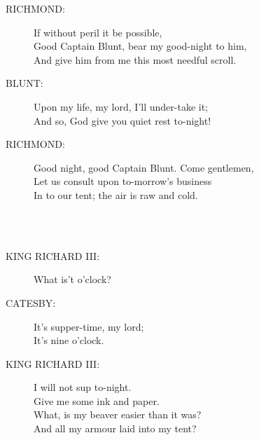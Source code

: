 \documentclass{article}
\begin{document}
\begin{description}
\item[RICHMOND:] 
\hspace{1pt}If without peril it be possible,\\
\hspace{1pt}Good Captain Blunt, bear my good-night to him,\\
\hspace{1pt}And give him from me this most needful scroll.\\
\end{description}
\begin{description}
\item[BLUNT:] 
\hspace{1pt}Upon my life, my lord, I'll under-take it;\\
\hspace{1pt}And so, God give you quiet rest to-night!\\
\end{description}
\begin{description}
\item[RICHMOND:] 
\hspace{1pt}Good night, good Captain Blunt. Come gentlemen,\\
\hspace{1pt}Let us consult upon to-morrow's business\\
\hspace{1pt}In to our tent; the air is raw and cold.\\
\end{description}
\\
\\
\begin{description}
\item[KING RICHARD III:] 
\hspace{1pt}What is't o'clock?\\
\end{description}
\begin{description}
\item[CATESBY:] 
\hspace{1pt}It's supper-time, my lord;\\
\hspace{1pt}It's nine o'clock.\\
\end{description}
\begin{description}
\item[KING RICHARD III:] 
\hspace{1pt}I will not sup to-night.\\
\hspace{1pt}Give me some ink and paper.\\
\hspace{1pt}What, is my beaver easier than it was?\\
\hspace{1pt}And all my armour laid into my tent?\\
\end{description}
\end{document}
